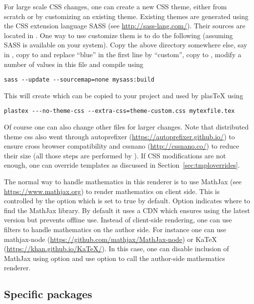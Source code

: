 For large scale CSS changes, one can create a new
CSS theme, either from scratch or by customizing an existing theme.
Existing themes are generated using the CSS extension language SASS (see
\url{http://sass-lang.com/}). Their sources are located in
. One way to use customize
them is to do the following (assuming SASS is available on your system).
Copy the above directory somewhere else, say in , copy
 to  and replace ``blue''
in the first line by ``custom'', copy  to
, modify a number of values in this file
and compile using
\begin{verbatim}
sass --update --sourcemap=none mysass:build
\end{verbatim}
This will create  which can be copied to
your project and used by plasTeX using
\begin{verbatim}
plastex ---no-theme-css --extra-css=theme-custom.css mytexfile.tex
\end{verbatim}
Of course one can also change other  files for larger
changes. Note that distributed theme css also went through autoprefixer
(\url{https://autoprefixer.github.io/}) to ensure cross browser
compatibility and cssnano (\url{http://cssnano.co/}) to reduce their
size (all those steps are performed by
). If CSS
modifications are not enough, one can override templates as discussed in
Section~\ref{sec:tmploverrides}.

The normal way to handle mathematics in this renderer is to use MathJax
(see \url{https://www.mathjax.org}) to render mathematics on client side. 
This is controlled by the  option which is
set to true by default. Option  indicates
where to find the MathJax library. By default it uses a CDN which
ensures using the latest version but prevents offline use.
Instead of client-side rendering, one can use filters to handle
mathematics on the author side. For instance one can use mathjax-node
(\url{https://github.com/mathjax/MathJax-node}) or KaTeX
(\url{https://khan.github.io/KaTeX/}). In this case, one can disable
inclusion of MathJax using option  and
use option  to call the author-side
mathematics renderer.

\subsection{Specific packages}

